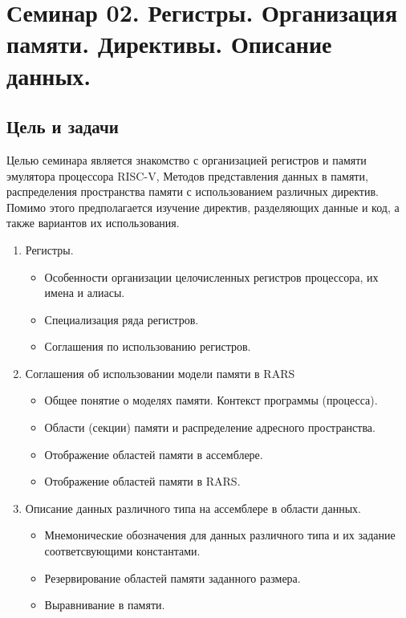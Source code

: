 \chapter[Регистры. Память. Данные. Команды]{Семинар 02. Регистры. Организация памяти. Директивы. Описание данных.}

\section{Цель и задачи}

Целью семинара является знакомство с организацией регистров и памяти эмулятора процессора RISC-V, Методов представления данных в памяти, распределения пространства памяти с использованием различных директив. Помимо этого предполагается изучение директив, разделяющих данные и код, а также вариантов их использования.

\begin{enumerate}
    \item Регистры.
    \begin{itemize}
        \item Особенности организации целочисленных регистров процессора, их имена и алиасы.
        \item Специализация ряда регистров.
        \item Соглашения по использованию регистров.
    \end{itemize}
    \item Соглашения об использовании модели памяти в RARS
    \begin{itemize}
        \item Общее понятие о моделях памяти. Контекст программы (процесса).
        \item Области (секции) памяти и распределение адресного пространства.
        \item Отображение областей памяти в ассемблере.
        \item Отображение областей памяти в RARS.
    \end{itemize}
    \item Описание данных различного типа на ассемблере в области данных.
    \begin{itemize}
        \item Мнемонические обозначения для данных различного типа и их задание соответсвующими константами.
        \item Резервирование областей памяти заданного размера.
        \item Выравнивание в памяти.
    \end{itemize}
\end{enumerate}

